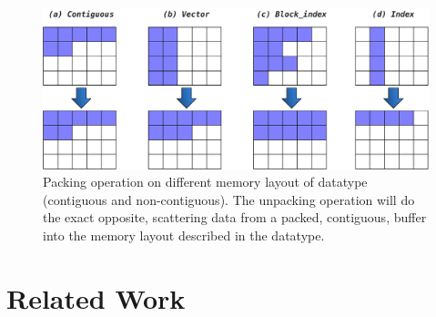 \documentclass[conference]{IEEEtran}
\begin{document}
\begin{figure}[ht]
  \centering
  \includegraphics[width=0.8\linewidth]{ddt_ompi.pdf}
  \caption{Packing operation on different memory layout of datatype (contiguous and non-contiguous). The unpacking operation will do the exact opposite, scattering data from a packed, contiguous, buffer into the memory layout described in the \mpi datatype.}
  \label{fig:ddt_ompi}
\end{figure}

\section{Related Work}\label{sec:related}
\end{document}
